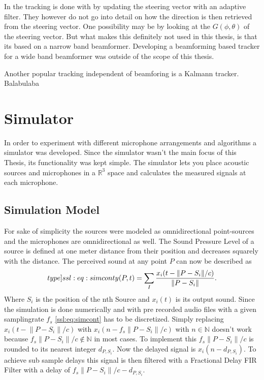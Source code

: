 In \cite{Dornetracker} the tracking is done with by 
updating the steering vector with an adaptive filter. 
They however do not go into detail on how the direction is then
retrieved from the steering vector.
One possibility may be by looking at the $G(\phi, \theta)$ of the steering vector.
But what makes this definitely not used in this thesis, is that its based on a 
narrow band beamformer. 
Developing a beamforming based tracker for a wide band beamformer was outside of the 
scope of this thesis.

Another popular tracking independent of beamforing is a Kalmann tracker.
Balabulaba

\newpage
\section{Simulator}
In order to experiment with different microphone arrangements and algorithms a simulator was developed.
Since the simulator wasn't the main focus of this Thesis, its functionality was kept simple.
The simulator lets you place acoustic sources and microphones in a $\mathbb{R}^3$ space and calculates
the measured signals at each microphone.

\subsection{Simulation Model}
For sake of simplicity the sources were modeled as omnidirectional point-sources and the
microphones are omnidirectional as well.
The Sound Pressure Level of a source is defined at one meter distance from their position and decreases
squarely with the distance.
The perceived sound at any point $P$ can now be described as
\begin{equation}
	\label[type]{ssl:eq:simcont}
	y(P, t) = \sum_{I} \frac{x_i(t - \lVert P - S_i\rVert/c)}{\lVert P - S_i\rVert}.
\end{equation}
Where $S_i$ is the position of the nth Source and $x_i(t)$ is its output sound.
Since the simulation is done numerically and with pre recorded audio files with a given
samplingrate $f_s$ \eqref{ssl:eq:simcont} has to be discretized.
Simply replacing $x_i(t - \lVert P - S_i\rVert/c)$ with
$x_i(n - f_s \lVert P - S_i\rVert/c)$ with
$n \in \mathbb{N}$ doesn't work because
$f_s \lVert P - S_i\rVert/c \not \in \mathbb{N}$ in most cases.
To implement this $f_s \lVert P - S_i\rVert/c$ is rounded to
its nearest integer $d_{P,S_i}$.
Now the delayed signal is $x_i(n - d_{P,S_i})$.
To achieve sub sample delays this signal is then filtered
with a Fractional Delay FIR Filter with a delay of
$f_s \lVert P - S_i\rVert/c - d_{P,S_i}$.

